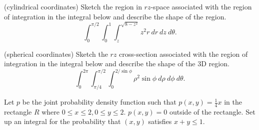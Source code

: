 \documentclass[12pt,letterpaper,noanswers]{exam}
\begin{document}
 \pdfpageheight 11in 
  \pdfpagewidth 8.5in



\begin{questions}
\item (cylindrical coordinates) Sketch the region in $rz$-space associated with the region of integration in the integral below and describe the shape of the region.
\[\int_0^{\pi/2}\int_0^1\int_z^{\sqrt{8-z^2}} z^2r\ dr\ dz\ d\theta.\]


\vfill

\item (spherical coordinates) Sketch the $rz$ cross-section associated with the region of integration in the integral below and describe the shape of the 3D region.
\[\int_0^{2\pi}\int_{\pi/4}^{\pi/2}\int_0^{2/\sin\phi} \rho^2\sin\phi\ d\rho\ d\phi\ d\theta.\]

\vfill

\item Let $p$ be the joint probability density function such that $p(x,y) = \frac{1}{4}x$ in the rectangle $R$ where $0\leq x \leq 2, 0\leq y\leq 2$.  $p(x,y) =0$ outside of the rectangle.  Set up an integral for the probability that $(x,y)$ satisfies $x+y \leq 1$.

\vfill

\end{questions}
\end{document}
